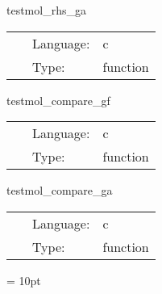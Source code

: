 \vspace{5mm}


\hspace{5mm} testmol\_rhs\_ga 

\hspace{5mm}{\it compute the rhs for the evolved grid function } 


\hspace{5mm}

 \begin{tabular*}{160mm}{cll} 
~ & Language:  & c \\ 
~ & Type:  & function \\ 
\end{tabular*} 


\vspace{5mm}


\hspace{5mm} testmol\_compare\_gf 

\hspace{5mm}{\it compare analytic and numerial result in grid function } 


\hspace{5mm}

 \begin{tabular*}{160mm}{cll} 
~ & Language:  & c \\ 
~ & Type:  & function \\ 
\end{tabular*} 


\vspace{5mm}


\hspace{5mm} testmol\_compare\_ga 

\hspace{5mm}{\it compare analytic and numerial result in grid array } 


\hspace{5mm}

 \begin{tabular*}{160mm}{cll} 
~ & Language:  & c \\ 
~ & Type:  & function \\ 
\end{tabular*} 



\vspace{5mm}\parskip = 10pt 
